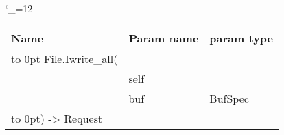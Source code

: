 \begingroup \catcode`\_=12 \tt
\begin{tabular}{lll}
\toprule
\textrm{Name}&\textrm{Param name}&\textrm{param type}\\
\midrule
\hbox to 0pt {File.Iwrite_all(\hss}\\
& self\\
& buf & BufSpec\\
\hbox to 0pt{) -> Request\hss}\\
\bottomrule
\end{tabular}
\endgroup
